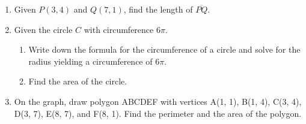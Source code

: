 \documentclass[12pt, oneside]{article}
\begin{document}
\begin{enumerate}
  \item Given $P(3,4)$ and $Q(7,1)$, find the length of $\overline{PQ}$.
      \vspace{6cm}

  \item Given the circle $C$ with circumference $6\pi$.
  \begin{enumerate}
    \item Write down the formula for the circumference of a circle and solve for the radius yielding a circumference of $6\pi$. \vspace{1cm}
    \item Find the area of the circle.
  \end{enumerate}

  \item On the graph, draw polygon ABCDEF with vertices A(1, 1), B(1, 4), C(3, 4), D(3, 7), E(8, 7), and F(8, 1). Find the perimeter and the area of the polygon.\\[1cm]
  \vspace{2cm}

  \end{enumerate}
\end{document}
